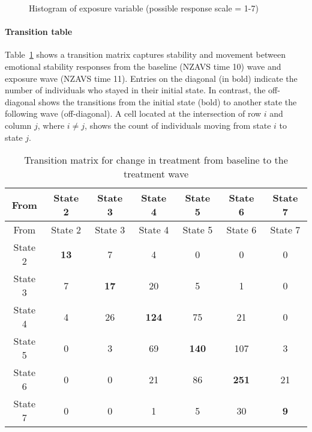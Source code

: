 \documentclass[
  singlecolumn]{article}
\let\oldparagraph\paragraph
\renewcommand{\paragraph}[1]{\oldparagraph{#1}\mbox{}}
\begin{document}
\begin{figure}


\caption{\label{fig-histogram-emotional}Histogram of exposure variable
(possible response scale = 1-7)}

\end{figure}%

\paragraph{Transition table}\label{transition-table-2}

Table~\ref{tbl-transition-emotional} shows a transition matrix captures
stability and movement between emotional stability responses from the
baseline (NZAVS time 10) wave and exposure wave (NZAVS time 11). Entries
on the diagonal (in bold) indicate the number of individuals who stayed
in their initial state. In contrast, the off-diagonal shows the
transitions from the initial state (bold) to another state the following
wave (off-diagonal). A cell located at the intersection of row \(i\) and
column \(j\), where \(i \neq j\), shows the count of individuals moving
from state \(i\) to state \(j\).

\begin{longtable}[]{@{}ccccccc@{}}
\caption{Transition matrix for change in treatment from baseline to the
treatment wave}\label{tbl-transition-emotional}\tabularnewline
\toprule\noalign{}
From & State 2 & State 3 & State 4 & State 5 & State 6 & State 7 \\
\midrule\noalign{}
\endfirsthead
\toprule\noalign{}
From & State 2 & State 3 & State 4 & State 5 & State 6 & State 7 \\
\midrule\noalign{}
\endhead
\bottomrule\noalign{}
\endlastfoot
State 2 & \textbf{13} & 7 & 4 & 0 & 0 & 0 \\
State 3 & 7 & \textbf{17} & 20 & 5 & 1 & 0 \\
State 4 & 4 & 26 & \textbf{124} & 75 & 21 & 0 \\
State 5 & 0 & 3 & 69 & \textbf{140} & 107 & 3 \\
State 6 & 0 & 0 & 21 & 86 & \textbf{251} & 21 \\
State 7 & 0 & 0 & 1 & 5 & 30 & \textbf{9} \\
\end{longtable}
\end{document}
